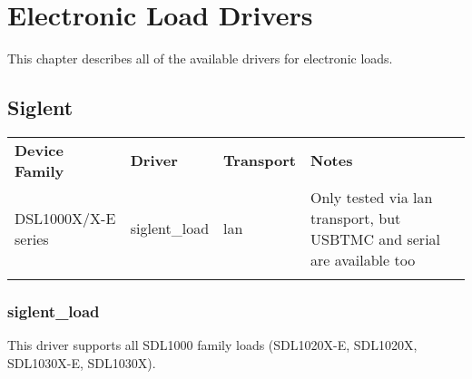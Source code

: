 \chapter{Electronic Load Drivers}
\label{sec:load-drivers}

This chapter describes all of the available drivers for electronic loads.

\section{Siglent}

\begin{tabularx}{16cm}{lllX}
\thickhline
\textbf{Device Family} & \textbf{Driver} & \textbf{Transport} & \textbf{Notes} \\
\thickhline
DSL1000X/X-E series & siglent\_load & lan & Only tested via lan transport, but USBTMC and serial are available too\\
\thickhline
\end{tabularx}

\subsection{siglent\_load}

This driver supports all SDL1000 family loads (SDL1020X-E, SDL1020X, SDL1030X-E, SDL1030X).
